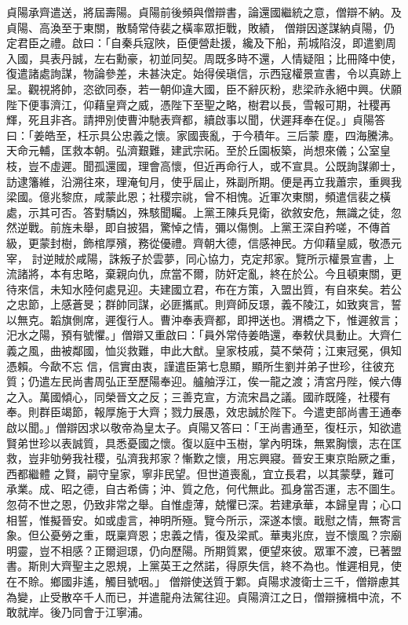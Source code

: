 \begin{pinyinscope}
 貞陽承齊遣送，將屆壽陽。貞陽前後頻與僧辯書，論還國繼統之意，僧辯不納。及貞陽、高渙至于東關，散騎常侍裴之橫率眾拒戰，敗績，
 僧辯因遂謀納貞陽，仍定君臣之禮。啟曰：「自秦兵寇陜，臣便營赴援，纔及下船，荊城陷沒，即遣劉周入國，具表丹誠，左右勳豪，初並同契。周既多時不還，人情疑阻；比冊降中使，復遣諸處詢謀，物論參差，未甚決定。始得侯瑱信，示西寇權景宣書，令以真跡上呈。觀視將帥，恣欲同泰，若一朝仰違大國，臣不辭灰粉，悲梁祚永絕中興。伏願陛下便事濟江，仰藉皇齊之威，憑陛下至聖之略，樹君以長，雪報可期，社稷再輝，死且非吝。請押別使曹沖馳表齊都，續啟事以聞，伏遲拜奉在促。」貞陽答曰：「姜皓至，枉示具公忠義之懷。家國喪亂，于今積年。三后蒙
 塵，四海騰沸。天命元輔，匡救本朝。弘濟艱難，建武宗祏。至於丘園板築，尚想來儀；公室皇枝，豈不虛遲。聞孤還國，理會高懷，但近再命行人，或不宣具。公既詢謀卿士，訪逮籓維，沿溯往來，理淹旬月，使乎屆止，殊副所期。便是再立我蕭宗，重興我梁國。億兆黎庶，咸蒙此恩；社稷宗祧，曾不相愧。近軍次東關，頻遣信裴之橫處，示其可否。答對驕凶，殊駭聞矚。上黨王陳兵見衛，欲敘安危，無識之徒，忽然逆戰。前旌未舉，即自披猖，驚悼之情，彌以傷惻。上黨王深自矜嗟，不傳首級，更蒙封樹，飾棺厚殯，務從優禮。齊朝大德，信感神民。方仰藉皇威，敬憑元宰，
 討逆賊於咸陽，誅叛子於雲夢，同心協力，克定邦家。覽所示權景宣書，上流諸將，本有忠略，棄親向仇，庶當不爾，防奸定亂，終在於公。今且頓東關，更待來信，未知水陸何處見迎。夫建國立君，布在方策，入盟出質，有自來矣。若公之忠節，上感蒼旻；群帥同謀，必匪攜貳。則齊師反璟，義不陵江，如致爽言，誓以無克。韜旗側席，遲復行人。曹沖奉表齊都，即押送也。渭橋之下，惟遲敘言；汜水之陽，預有號懼。」僧辯又重啟曰：「員外常侍姜皓還，奉敕伏具動止。大齊仁義之風，曲被鄰國，恤災救難，申此大猷。皇家枝戚，莫不榮荷；江東冠冕，俱知憑賴。今歃不忘
 信，信實由衷，謹遣臣第七息顯，顯所生劉并弟子世珍，往彼充質；仍遣左民尚書周弘正至歷陽奉迎。艫舳浮江，俟一龍之渡；清宮丹陛，候六傳之入。萬國傾心，同榮晉文之反；三善克宣，方流宋昌之議。國祚既隆，社稷有奉。則群臣竭節，報厚施于大齊；戮力展愚，效忠誠於陛下。今遣吏部尚書王通奉啟以聞。」僧辯因求以敬帝為皇太子。貞陽又答曰：「王尚書通至，復枉示，知欲遣賢弟世珍以表誠質，具悉憂國之懷。復以庭中玉樹，掌內明珠，無累胸懷，志在匡救，豈非劬勞我社稷，弘濟我邦家？慚歎之懷，用忘興寢。晉安王東京貽厥之重，西都繼體
 之賢，嗣守皇家，寧非民望。但世道喪亂，宜立長君，以其蒙孽，難可承業。成、昭之德，自古希儔；沖、質之危，何代無此。孤身當否運，志不圖生。忽荷不世之恩，仍致非常之舉。自惟虛薄，兢懼已深。若建承華，本歸皇胄；心口相誓，惟擬晉安。如或虛言，神明所殛。覽今所示，深遂本懷。戢慰之情，無寄言象。但公憂勞之重，既稟齊恩；忠義之情，復及梁貳。華夷兆庶，豈不懷風？宗廟明靈，豈不相感？正爾迴璟，仍向歷陽。所期質累，便望來彼。眾軍不渡，已著盟書。斯則大齊聖主之恩規，上黨英王之然諾，得原失信，終不為也。惟遲相見，使在不賒。鄉國非遙，觸目號咽。」
 僧辯使送質于鄴。貞陽求渡衛士三千，僧辯慮其為變，止受散卒千人而已，并遣龍舟法駕往迎。貞陽濟江之日，僧辯擁楫中流，不敢就岸。後乃同會于江寧浦。




\end{pinyinscope}
